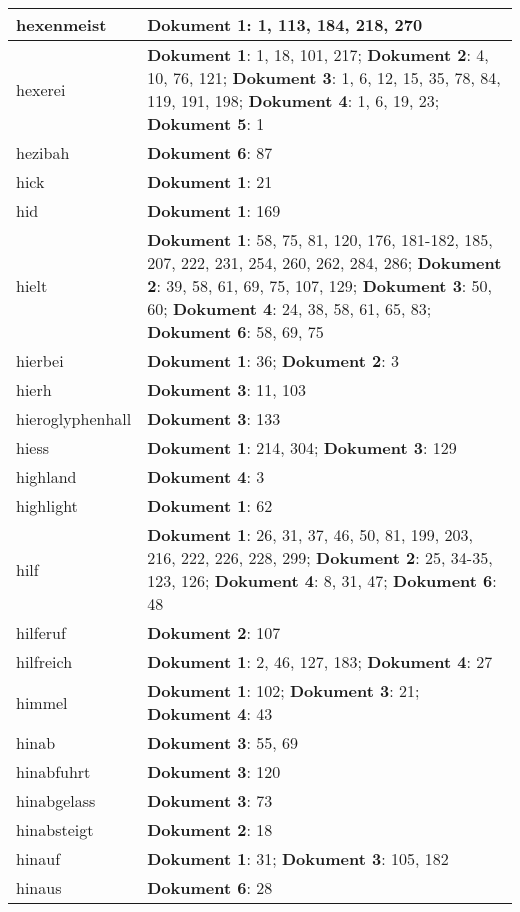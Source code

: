 \documentclass[a5paper]{article}
\begin{document}
\begin{longtable}[l]{|l|p{3in}|}
\hline
hexenmeist & \textbf{Dokument 1}: 1, 113, 184, 218, 270 \\
\hline
hexerei & \textbf{Dokument 1}: 1, 18, 101, 217; \textbf{Dokument 2}: 4, 10, 76, 121; \textbf{Dokument 3}: 1, 6, 12, 15, 35, 78, 84, 119, 191, 198; \textbf{Dokument 4}: 1, 6, 19, 23; \textbf{Dokument 5}: 1 \\
\hline
hezibah & \textbf{Dokument 6}: 87 \\
\hline
hick & \textbf{Dokument 1}: 21 \\
\hline
hid & \textbf{Dokument 1}: 169 \\
\hline
hielt & \textbf{Dokument 1}: 58, 75, 81, 120, 176, 181-182, 185, 207, 222, 231, 254, 260, 262, 284, 286; \textbf{Dokument 2}: 39, 58, 61, 69, 75, 107, 129; \textbf{Dokument 3}: 50, 60; \textbf{Dokument 4}: 24, 38, 58, 61, 65, 83; \textbf{Dokument 6}: 58, 69, 75 \\
\hline
hierbei & \textbf{Dokument 1}: 36; \textbf{Dokument 2}: 3 \\
\hline
hierh & \textbf{Dokument 3}: 11, 103 \\
\hline
hieroglyphenhall & \textbf{Dokument 3}: 133 \\
\hline
hiess & \textbf{Dokument 1}: 214, 304; \textbf{Dokument 3}: 129 \\
\hline
highland & \textbf{Dokument 4}: 3 \\
\hline
highlight & \textbf{Dokument 1}: 62 \\
\hline
hilf & \textbf{Dokument 1}: 26, 31, 37, 46, 50, 81, 199, 203, 216, 222, 226, 228, 299; \textbf{Dokument 2}: 25, 34-35, 123, 126; \textbf{Dokument 4}: 8, 31, 47; \textbf{Dokument 6}: 48 \\
\hline
hilferuf & \textbf{Dokument 2}: 107 \\
\hline
hilfreich & \textbf{Dokument 1}: 2, 46, 127, 183; \textbf{Dokument 4}: 27 \\
\hline
himmel & \textbf{Dokument 1}: 102; \textbf{Dokument 3}: 21; \textbf{Dokument 4}: 43 \\
\hline
hinab & \textbf{Dokument 3}: 55, 69 \\
\hline
hinabfuhrt & \textbf{Dokument 3}: 120 \\
\hline
hinabgelass & \textbf{Dokument 3}: 73 \\
\hline
hinabsteigt & \textbf{Dokument 2}: 18 \\
\hline
hinauf & \textbf{Dokument 1}: 31; \textbf{Dokument 3}: 105, 182 \\
\hline
hinaus & \textbf{Dokument 6}: 28 \\

\end{longtable}
\end{document}
